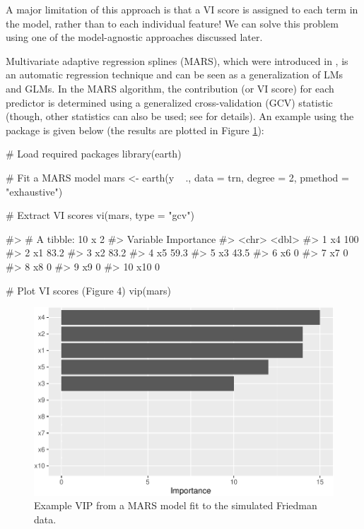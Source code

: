 A major limitation of this approach is that a VI score is assigned to
each term in the model, rather than to each individual feature! We can
solve this problem using one of the model-agnostic approaches discussed
later.

Multivariate adaptive regression splines (MARS), which were introduced
in \citet{multivariate-friedman-1991}, is an automatic regression
technique and can be seen as a generalization of LMs and GLMs. In the
MARS algorithm, the contribution (or VI score) for each predictor is
determined using a generalized cross-validation (GCV) statistic (though,
other statistics can also be used; see  for
details). An example using the  package \citep{R-earth}
is given below (the results are plotted in Figure \ref{fig:vip-earth}):

\begin{Schunk}
\begin{Sinput}
# Load required packages
library(earth)

# Fit a MARS model
mars <- earth(y ~ ., data = trn, degree = 2, pmethod = "exhaustive")

# Extract VI scores
vi(mars, type = "gcv")
\end{Sinput}
\begin{Soutput}
#> # A tibble: 10 x 2
#>    Variable Importance
#>    <chr>         <dbl>
#>  1 x4            100  
#>  2 x1             83.2
#>  3 x2             83.2
#>  4 x5             59.3
#>  5 x3             43.5
#>  6 x6              0  
#>  7 x7              0  
#>  8 x8              0  
#>  9 x9              0  
#> 10 x10             0
\end{Soutput}
\begin{Sinput}
# Plot VI scores (Figure 4)
vip(mars)
\end{Sinput}
\begin{figure}[!htb]

{\centering \includegraphics[width=0.7\linewidth]{greenwell-boehmke_files/figure-latex/vip-earth-1} 

}

\caption[Example VIP from a MARS model fit to the simulated Friedman data]{Example VIP from a MARS model fit to the simulated Friedman data.}\label{fig:vip-earth}
\end{figure}
\end{Schunk}

